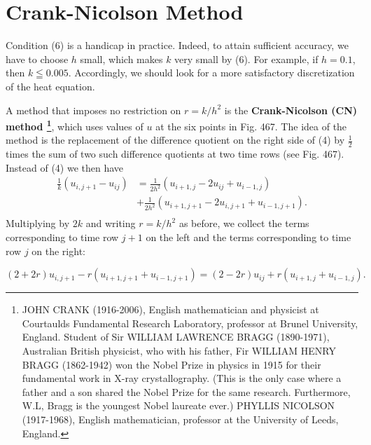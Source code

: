\section*{\color{blue} Crank-Nicolson Method}
Condition (6) is a handicap in practice. Indeed, to attain sufficient accuracy, we have to choose $h$ small, which makes $k$ very small by (6). For example, if $h=0.1$, then $k\leqq0.005$. Accordingly, we should look for a more satisfactory discretization of the heat equation.

A method that imposes no restriction on $r=k/h^2$ is the \textbf{Crank-Nicolson (CN) method \footnote{JOHN CRANK (1916-2006), English mathematician and physicist at Courtaulds Fundamental Research Laboratory, professor at Brunel University, England. Student of Sir WILLIAM LAWRENCE BRAGG (1890-1971), Australian British physicist, who with his father, Fir WILLIAM HENRY BRAGG (1862-1942) won the Nobel Prize in physics in 1915 for their fundamental work in X-ray crystallography. (This is the only case where a father and a son shared the Nobel Prize for the same research. Furthermore, W.L, Bragg is the youngest Nobel laureate ever.) PHYLLIS NICOLSON (1917-1968), English mathematician, professor at the University of Leeds, England.}}, which uses values of $u$ at the six points in Fig. 467. The idea of the method is the replacement of the difference quotient on the right side of (4) by $\frac{1}{2}$ times the sum of two such difference quotients at two time rows (see Fig. 467). Instead of (4) we then have
\begin{equation}\tag{21.7}
\begin{split}
\frac{1}{k}(u_{i,j+1}-u_{ij})&=\frac{1}{2h^2}(u_{i+1,j}-2u_{ij}+u_{i-1,j}) \\&
+\frac{1}{2h^2}(u_{i+1,j+1}-2u_{i,j+1}+u_{i-1,j+1}). \\&
\end{split}
\end{equation}
Multiplying by $2k$ and writing $r=k/h^2$ as before, we collect the terms corresponding to time row $j+1$ on the left and the terms corresponding to time row $j$ on the right: \\
\begin{graybox}
\begin{equation}\tag{21.8}
(2+2r)u_{i,j+1}-r(u_{i+1,j+1}+u_{i-1,j+1})=(2-2r)u_{ij}+r(u_{i+1,j}+u_{i-1,j}).
\end{equation}
\end{graybox}

